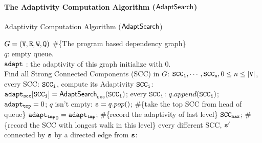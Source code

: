 \paragraph*{The Adaptivity Computation Algorithm ($\mathsf{AdaptSearch}$)}
\begin{algorithm}
    \caption{
    {Adaptivity Computation Algorithm ($\mathsf{AdaptSearch}$)}
    \label{alg:adpt_alg}
    }
    \begin{algorithmic}[1]
    \REQUIRE $G = (\mathtt{V}, \mathtt{E}, \mathtt{W}, \mathtt{Q})$ \#\{The program based dependency graph\}
    \\
    $q$: empty queue.
    \\
    $\mathtt{adapt}$ : the adaptivity of this graph initialize with $0$.
    \\
    \STATE Find all Strong Connected Components (SCC) in $G$: $\mathtt{SCC_1}, \cdots, \mathtt{SCC_n}, 0 \leq n \leq |\mathtt{V}|$, 
     every SCC: $\mathtt{SCC_i}$, compute its Adaptivity $\mathtt{SCC_i}$:
    \STATE \quad $\mathtt{adapt_{scc}[SCC_i] = \mathsf{AdaptSearch}_{scc}(SCC_i)}$;
     every $\mathtt{SCC_i}$:
    \STATE \qquad $q.append(\mathtt{SCC_i})$;
    \STATE \qquad $\mathtt{adapt_{tmp}} = 0$;
    \STATE {} $q$ isn't empty:
    \STATE \qquad \qquad $\mathtt{s} = q.pop()$;  \#\{take the top SCC from head of queue\}
    \STATE \qquad \qquad  $\mathtt{adapt_{tmp}}_0= \mathtt{adapt_{tmp}}$; \#\{record the adaptivity of last level\}
    \STATE \qquad \qquad  $\mathtt{SCC_{max}}$;  \#\{record the SCC with longest walk in this level\}
    \STATE \qquad {} every 
    different SCC, $\mathtt{s'}$ connected by $\mathtt{s}$ by a directed edge from $\mathtt{s}$:

\end{algorithmic}
\end{algorithm}
